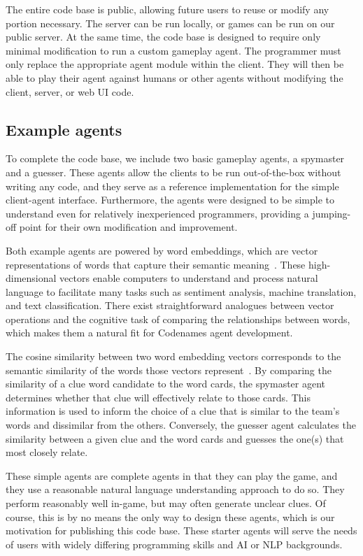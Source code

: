 \documentclass[phd,electronic,oneside,twosidetoc,letterpaper,chaptercenter,parttop,lof]{byumsphd}
\begin{document}
The entire code base is public, allowing future users to reuse or modify any portion necessary. The server can be run locally, or games can be run on our public server. At the same time, the code base is designed to require only minimal modification to run a custom gameplay agent. The programmer must only replace the appropriate agent module within the client. They will then be able to play their agent against humans or other agents without modifying the client, server, or web UI code.

\subsection{Example agents}
To complete the code base, we include two basic gameplay agents, a spymaster and a guesser. These agents allow the clients to be run out-of-the-box without writing any code, and they serve as a reference implementation for the simple client-agent interface. Furthermore, the agents were designed to be simple to understand even for relatively inexperienced programmers, providing a jumping-off point for their own modification and improvement.

Both example agents are powered by word embeddings, which are vector representations of words that capture their semantic meaning~\cite{mikolov2013distributed}. These high-dimensional vectors enable computers to understand and process natural language to facilitate many tasks such as sentiment analysis, machine translation, and text classification. There exist straightforward analogues between vector operations and the cognitive task of comparing the relationships between words, which makes them a natural fit for Codenames agent development.

The cosine similarity between two word embedding vectors corresponds to the semantic similarity of the words those vectors represent~\cite{orkphol2019word}. By comparing the similarity of a clue word candidate to the word cards, the spymaster agent determines whether that clue will effectively relate to those cards. This information is used to inform the choice of a clue that is similar to the team's words and dissimilar from the others. Conversely, the guesser agent calculates the similarity between a given clue and the word cards and guesses the one(s) that most closely relate.

These simple agents are complete agents in that they can play the game, and they use a reasonable natural language understanding approach to do so. They perform reasonably well in-game, but may often generate unclear clues. Of course, this is by no means the only way to design these agents, which is our motivation for publishing this code base. These starter agents will serve the needs of users with widely differing programming skills and AI or NLP backgrounds.
\end{document}
